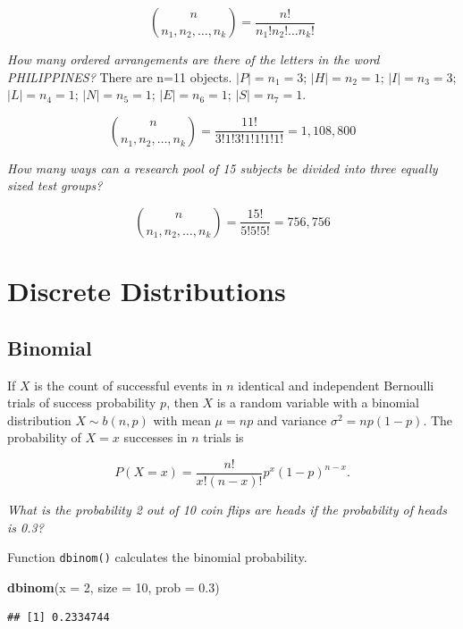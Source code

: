 \documentclass[
]{book}
\newenvironment{Shaded}{\begin{snugshade}}{\end{snugshade}}
\newcommand{\DataTypeTok}[1]{\textcolor[rgb]{0.13,0.29,0.53}{#1}}
\newcommand{\DecValTok}[1]{\textcolor[rgb]{0.00,0.00,0.81}{#1}}
\newcommand{\FloatTok}[1]{\textcolor[rgb]{0.00,0.00,0.81}{#1}}
\newcommand{\KeywordTok}[1]{\textcolor[rgb]{0.13,0.29,0.53}{\textbf{#1}}}
\newcommand{\NormalTok}[1]{#1}
\begin{document}
\[{n \choose {n_1, n_2, \dots, n_k}} = \frac{n!}{n_1! n_2! \dots n_k!}\]

\emph{How many ordered arrangements are there of the letters in the word PHILIPPINES?} There are n=11 objects. \(|P|=n_1=3\); \(|H|=n_2=1\); \(|I|=n_3=3\); \(|L|=n_4=1\); \(|N|=n_5=1\); \(|E|=n_6=1\); \(|S|=n_7=1\).

\[{n \choose {n_1, n_2, \dots, n_k}} = \frac{11!}{3! 1! 3! 1! 1! 1! 1!} = 1,108,800\]

\emph{How many ways can a research pool of 15 subjects be divided into three equally sized test groups?}

\[{n \choose {n_1, n_2, \dots, n_k}} = \frac{15!}{5! 5! 5!} = 756,756\]

\hypertarget{discrete-distributions}{%
\section{Discrete Distributions}\label{discrete-distributions}}

\hypertarget{binomial}{%
\subsection{Binomial}\label{binomial}}

If \(X\) is the count of successful events in \(n\) identical and independent Bernoulli trials of success probability \(p\), then \(X\) is a random variable with a binomial distribution \(X \sim b(n,p)\) with mean \(\mu=np\) and variance \(\sigma^2 = np(1-p)\). The probability of \(X=x\) successes in \(n\) trials is

\[P(X=x) = \frac{{n!}}{{x!(n-x)!}} p^x (1-p)^{n-x}.\]

\emph{What is the probability 2 out of 10 coin flips are heads if the probability of heads is 0.3?}

Function \texttt{dbinom()} calculates the binomial probability.

\begin{Shaded}
\begin{Highlighting}[]
\KeywordTok{dbinom}\NormalTok{(}\DataTypeTok{x =} \DecValTok{2}\NormalTok{, }\DataTypeTok{size =} \DecValTok{10}\NormalTok{, }\DataTypeTok{prob =} \FloatTok{0.3}\NormalTok{)}
\end{Highlighting}
\end{Shaded}

\begin{verbatim}
## [1] 0.2334744
\end{verbatim}
\end{document}
